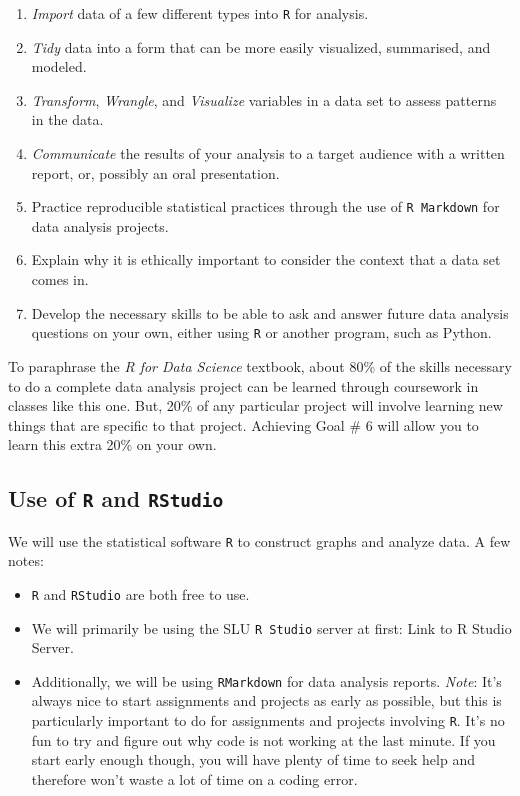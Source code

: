 \documentclass[
]{book}
\providecommand{\tightlist}{%
  \setlength{\itemsep}{0pt}\setlength{\parskip}{0pt}}
\begin{document}
\begin{enumerate}
\def\labelenumi{\arabic{enumi}.}
\item
  \emph{Import} data of a few different types into \texttt{R} for analysis.
\item
  \emph{Tidy} data into a form that can be more easily visualized, summarised, and modeled.
\item
  \emph{Transform}, \emph{Wrangle}, and \emph{Visualize} variables in a data set to assess patterns in the data.
\item
  \emph{Communicate} the results of your analysis to a target audience with a written report, or, possibly an oral presentation.
\item
  Practice reproducible statistical practices through the use of \texttt{R\ Markdown} for data analysis projects.
\item
  Explain why it is ethically important to consider the context that a data set comes in.
\item
  Develop the necessary skills to be able to ask and answer future data analysis questions on your own, either using \texttt{R} or another program, such as Python.
\end{enumerate}

To paraphrase the \emph{R for Data Science} textbook, about 80\% of the skills necessary to do a complete data analysis project can be learned through coursework in classes like this one. But, 20\% of any particular project will involve learning new things that are specific to that project. Achieving Goal \# 6 will allow you to learn this extra 20\% on your own.

\hypertarget{use-of-r-and-rstudio}{%
\subsection{\texorpdfstring{Use of \texttt{R} and \texttt{RStudio}}{Use of R and RStudio}}\label{use-of-r-and-rstudio}}

We will use the statistical software \texttt{R} to construct graphs and analyze data. A few notes:

\begin{itemize}
\tightlist
\item
  \texttt{R} and \texttt{RStudio} are both free to use.
\item
  We will primarily be using the SLU \texttt{R\ Studio} server at first: Link to R Studio Server.
\item
  Additionally, we will be using \texttt{RMarkdown} for data analysis reports.
  \emph{Note}: It's always nice to start assignments and projects as early as possible, but this is particularly important to do for assignments and projects involving \texttt{R}. It's no fun to try and figure out why code is not working at the last minute. If you start early enough though, you will have plenty of time to seek help and therefore won't waste a lot of time on a coding error.
\end{itemize}
\end{document}
